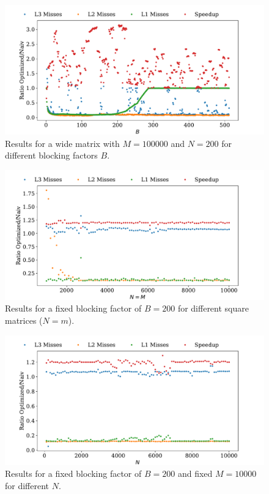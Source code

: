 \documentclass[a4paper, 11pt]{article}
\begin{document}
\begin{figure}
  \centering
  \includegraphics[width=\textwidth]{../plot/wide_against_B.pdf}
  \caption{Results for a wide matrix with $M=100000$ and $N=200$ for different blocking factors $B$.}
  \label{fig:narrow_against_B}
\end{figure}

\begin{figure}
  \centering
  \includegraphics[width=\textwidth]{../plot/fixed_B_different_squares.pdf}
  \caption{Results for a fixed blocking factor of $B=200$ for different square matrices ($N = m$).}
  \label{fig:fixed_B_different_squares}
\end{figure}

\begin{figure}
  \centering
  \includegraphics[width=\textwidth]{../plot/fixed_B_M_different_N.pdf}
  \caption{Results for a fixed blocking factor of $B=200$ and fixed $M=10000$
  for different $N$.}
  \label{fig:fixed_B_M_different_N}
\end{figure}
\end{document}
